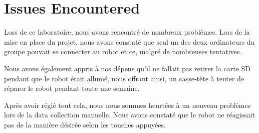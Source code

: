 \section{Issues Encountered}

Lors de ce laboratoire, nous avons rencontré de nombreux problèmes. Lors de la mise en place du projet, nous avons constaté que seul un des deux ordinateurs du groupe pouvait se connecter au robot et ce, malgré de nombreuses tentatives.

Nous avons également appris à nos dépens qu'il ne fallait pas retirer la carte SD pendant que le robot était allumé, nous offrant ainsi, un casse-tête à tenter de réparer le robot pendant toute une semaine. 

Après avoir réglé tout cela, nous nous sommes heurtées à un nouveau problèmes lors de la data collection manuelle. Nous avons constaté que le robot ne réagissait pas de la manière désirée selon les touches appuyées.